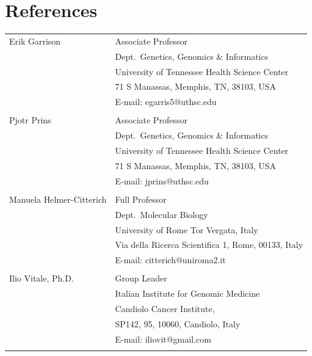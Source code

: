 \documentclass[oneside,11pt,a4paper,nologo]{book}
\begin{document}
\section*{References}

\begin{tabular}{p{5cm}p{11cm}}  %

Erik Garrison
  & Associate Professor \\
  & Dept.\ Genetics, Genomics \& Informatics \\
  & University of Tennessee Health Science Center \\
  & 71 S Manassas, Memphis, TN, 38103, USA \\
  & E-mail: egarris5@uthsc.edu \\
  & \\
Pjotr Prins
  & Associate Professor \\
  & Dept.\ Genetics, Genomics \& Informatics \\
  & University of Tennessee Health Science Center \\
  & 71 S Manassas, Memphis, TN, 38103, USA \\
  & E-mail: jprins@uthsc.edu \\
  & \\
Manuela Helmer-Citterich
  & Full Professor \\
  & Dept.\ Molecular Biology \\
  & University of Rome Tor Vergata, Italy \\
  & Via della Ricerca Scientifica 1, Rome, 00133, Italy \\
  & E-mail: citterich@uniroma2.it \\
  & \\
Ilio Vitale, Ph.D.
  & Group Leader \\
  & Italian Institute for Genomic Medicine \\
  & Candiolo Cancer Institute, \\
  & SP142, 95, 10060, Candiolo, Italy \\
  & E-mail: iliovit@gmail.com \\
  & \\
\end{tabular}


\end{document}

